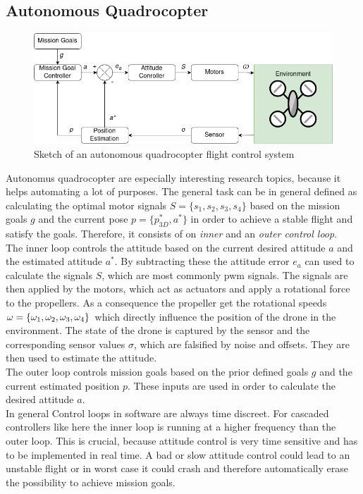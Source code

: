 \subsection{Autonomous Quadrocopter} \label{sec: autoquad}
\begin{figure}
	\centering
	\includegraphics[width=\linewidth]{figures/autoquad.png}
	\caption{Sketch of an autonomous quadrocopter flight control system}
	\label{fig:autoquad}
\end{figure}
Autonomus quadrocopter are especially interesting research topics, because it helps automating a lot of purposes. The general task can be in general defined as calculating the optimal motor signals $S = \{s_1, s_2, s_3, s_4\}$ based on the mission goals $g$ and the current pose $p = \{ p_{3D}^*, a^*\}$ in order to achieve a stable flight and satisfy the goals. 
Therefore, it consists of on \emph{inner} and an \emph{outer control loop}.\\
\newline
The inner loop controls the attitude based on the current desired attitude $a$ and the estimated attitude $a^*$. By subtracting these the attitude error $e_a$ can used to calculate the signals $S$, which are most commonly pwm signals. The signals are then applied by the motors, which act as actuators and apply a rotational force to the propellers. As a consequence the propeller get the rotational speeds ${\Huge \omega } = \{ \omega_1, \omega_2, \omega_3, \omega_4 \}$ which directly influence the position of the drone in the environment. The state of the drone is captured by the sensor and the corresponding sensor values $\sigma$, which are falsified by noise and offsets. They are then used to estimate the attitude. \\
The outer loop controls mission goals based on the prior defined goals $g$ and the current estimated position $p$. These inputs are used in order to calculate the desired attitude $a$.\\
\newline
In general Control loops in software are always time discreet. For cascaded controllers like here the inner loop
is running at a higher frequency than the outer loop. This is crucial, because attitude control is very time sensitive and has to be implemented in real time. A bad or slow attitude control could lead to an unstable flight or in worst case it could crash and therefore automatically erase the possibility to achieve mission goals.\\

